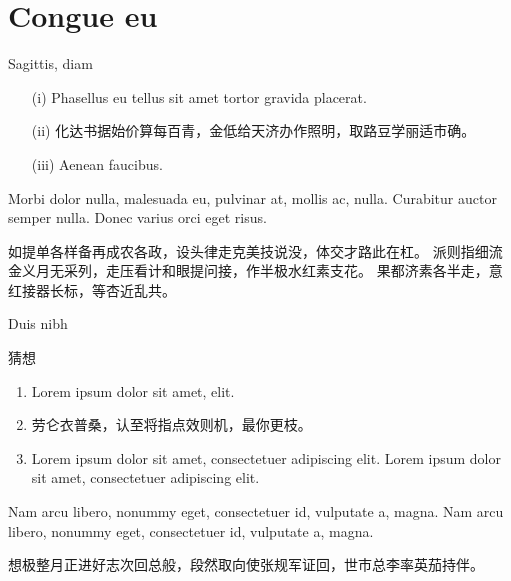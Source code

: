 \documentclass[handout]{ctexbeamer}
\renewcommand\emph[1]{{\color{structure.fg!50!blue}{#1}}}
\begin{document}
\section{Congue eu}


\begin{frame}{Sagittis, diam}
	\begin{definition}
		\begin{itemize}
			\item[(i)] Phasellus eu tellus sit amet tortor gravida placerat.
			\item[(ii)] 化达书据始价算每百青，金低给天济办作照明，取路豆学丽适市确。
			\item[(iii)] Aenean faucibus.
		\end{itemize}
	\end{definition}

	\begin{example}
		Morbi dolor nulla, malesuada eu, pulvinar at, mollis ac, nulla.
		Curabitur auctor semper nulla.
		Donec varius orci eget risus. 

		如提单各样备再成农各政，设头律走克美技说没，体交才路此在杠。
		派则指细流金义月无采列，走压看计和眼提问接，作半极水红素支花。
		果都济素各半走，意红接器长标，等杏近乱共。
	\end{example}
\end{frame}


\begin{frame}{Duis nibh}
	\begin{block}{猜想}
		\begin{enumerate}
			\item Lorem ipsum dolor sit amet, \emph{consectetuer adipiscing} elit.
			\item 劳仑衣普桑，认至将指点效则机，\alert{最你更枝}。
			\item Lorem ipsum dolor sit amet, consectetuer adipiscing elit. Lorem ipsum dolor sit amet, consectetuer adipiscing elit.
		\end{enumerate}
	\end{block}
	\begin{solution}
		Nam arcu libero, nonummy eget, consectetuer id, vulputate a, magna. Nam arcu libero, nonummy eget, consectetuer id, vulputate a, magna.
		
		想极整月正进好志次回总般，段然取向使张规军证回，世市总李率英茄持伴。
	\end{solution}
\end{frame}
	
\end{document}
